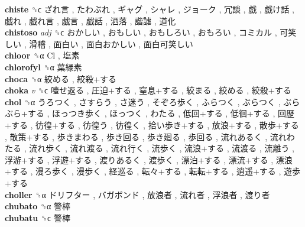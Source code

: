\textbf{chiste} ␝ϲ   ざれ言 ,  たわぶれ ,  ギャグ ,  シャレ ,  ジョーク ,  冗談 ,  戯 ,  戯け話 ,  戯れ ,  戯れ言 ,  戯言 ,  戯話 ,  洒落 ,  諧謔 ,  道化   \\
\textbf{chistoso} \emph{adj}  ␝ϲ   おかしい ,  おもしい ,  おもしろい ,  おもろい ,  コミカル ,  可笑しい ,  滑稽 ,  面白い ,  面白おかしい ,  面白可笑しい   \\
\textbf{chloor} ␝α   Cl ,  塩素   \\
\textbf{chlorofyl} ␝α   葉緑素   \\
\textbf{choca} ␝α   絞める ,  絞殺+する   \\
\textbf{choka} \emph{v}  ␝ϲ   噎せ返る ,  圧迫+する ,  窒息+する ,  絞まる ,  絞める ,  絞殺+する   \\
\textbf{chol} ␝α   うろつく ,  さすらう ,  さ迷う ,  そぞろ歩く ,  ふらつく ,  ぶらつく ,  ぶらぶら+する ,  ほっつき歩く ,  ほっつく ,  わたる ,  低回+する ,  低徊+する ,  回歴+する ,  彷徨+する ,  彷徨う ,  彷徨く ,  拾い歩き+する ,  放浪+する ,  散歩+する ,  散策+する ,  歩きまわる ,  歩き回る ,  歩き廻る ,  歩回る ,  流れあるく ,  流れわたる ,  流れ歩く ,  流れ渡る ,  流れ行く ,  流歩く ,  流浪+する ,  流渡る ,  流離う ,  浮游+する ,  浮遊+する ,  渡りあるく ,  渡歩く ,  漂泊+する ,  漂流+する ,  漂浪+する ,  漫ろ歩く ,  漫歩く ,  経巡る ,  転々+する ,  転転+する ,  逍遥+する ,  遊歩+する   \\
\textbf{choller} ␝α   ドリフター ,  バガボンド ,  放浪者 ,  流れ者 ,  浮浪者 ,  渡り者   \\
\textbf{chubato} ␝α   警棒   \\
\textbf{chubatu} ␝ϲ   警棒   \\
